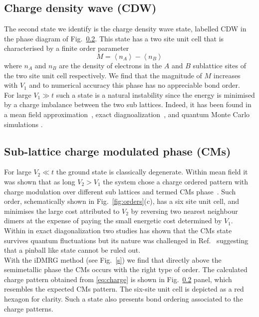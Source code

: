 \documentclass[aps,prx,10pt,twocolumn,floatfix,superscriptaddress,showpacs,numerical,footinbib]{revtex4-1}
\begin{document}
\subsection{Charge density wave (CDW)}
%
The second state we identify is the charge density wave state, labelled CDW in the phase diagram of Fig.~\ref{}.
%
This state has a two site unit cell that is characterised by a finite order parameter
%
\begin{equation}
\label{eq:CDW}
%
M=\left\langle n_{A} \right\rangle-\left\langle n_{B}\right\rangle
%
\end{equation}
%
where $n_{A}$ and $n_{B}$ are the density of electrons in the $A$ and $B$ sublattice sites of the two site unit cell respectively.
%
We find that the magnitude of $M$ increases with $V_{1}$ and to numerical accuracy this phase has no appreciable bond order.\\
%

For large $V_{1}\gg t$ such a state is a natural instability since the energy is minimised by a charge imbalance between the two sub lattices.
%
Indeed, it has been found in a mean field approximation~\cite{RQHZ08,WF10,GCCdJVV13}, exact diagnoalization~\cite{GGNVC13,DH14,DCH14}, and quantum Monte Carlo simulations
\cite{WCT14}.
%


\subsection{Sub-lattice charge modulated phase (CMs)}
%
For large $V_{2}\ll t$ the ground state is classically degenerate. 
%
Within mean field it was shown that as long $V_{2}>V_{1}$
the system chose a charge ordered pattern with charge modulation over different sub lattices and termed CMs phase~\cite{CMs}.
%
Such order, schematically shown in Fig.~\ref{fig:orders}(c), has a six site unit cell, and minimises the large cost
attributed to $V_{2}$ by reversing two nearest neighbour dimers at the expense of paying the small energetic cost
determined by $V_{1}$.
%
Within in exact diagonalization two studies has shown that the CMs state survives quantum fluctuations 
but its nature was challenged in Ref.~ suggesting that a pinball like state cannot be ruled out.\\

With the iDMRG method (see Fig.~\ref{s}) we find that directly above the semimetallic phase the CMs occurs with the right type of order.
%
The calculated charge pattern obtained from \eqref{eq:charge} is shown in Fig.~\ref{} panel, which resembles the expected
CMs pattern.
%
The six-site unit cell is depicted as a red hexagon for clarity. 
%
Such a state also presents bond ordering associated to the charge patterns.
\end{document}
